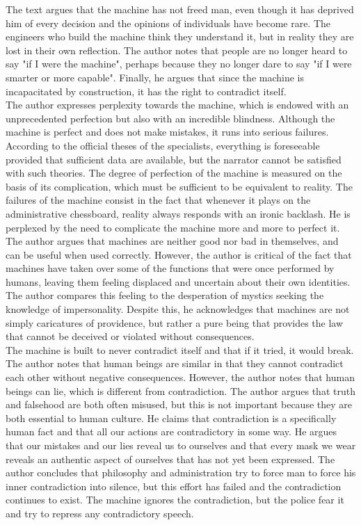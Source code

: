 \documentclass{homework}
\begin{document}
The text argues that the machine has not freed man, even though it has 
deprived him of every decision and the opinions of individuals have become rare. 
The engineers who build the machine think they understand it, but in reality 
they are lost in their own reflection. The author notes that people are no longer heard to 
say "if I were the machine", perhaps because they no longer dare to say "if I were smarter
or more capable".  
Finally, he argues that since the machine is incapacitated by construction, it has 
the right to contradict itself. \\
The author expresses perplexity towards the machine, which is 
endowed with an unprecedented perfection but also with an incredible blindness. 
Although the machine is perfect and does not make mistakes, it runs into serious 
failures. According to the official theses of the specialists, everything is 
foreseeable provided that sufficient data are available, but the narrator cannot 
be satisfied with such theories. The degree of perfection of the machine is 
measured on the basis of its complication, which must be sufficient to be 
equivalent to reality. The failures of the machine consist in the fact that 
whenever it plays on the administrative chessboard, reality always responds 
with an ironic backlash. He is perplexed by the need to complicate 
the machine more and more to perfect it. \\
The author argues that machines are neither good nor bad in themselves, 
and can be useful when used correctly. However, the author is critical of the fact 
that machines have taken over some of the functions that were once performed by 
humans, leaving them feeling displaced and uncertain about their own identities. 
The author compares this feeling to the desperation of mystics seeking the 
knowledge of impersonality. Despite this, he acknowledges that machines 
are not simply caricatures of providence, but rather a pure being that provides 
the law that cannot be deceived or violated without consequences. \\
The machine is built to never contradict itself and that if it tried, it 
would break. The author notes that human beings are similar in that they 
cannot contradict each other without negative consequences. However, 
the author notes that human beings can lie, which is different from 
contradiction. 
The author argues that truth and falsehood are both often misused, 
but this is not important because they are both essential to human 
culture. He claims that contradiction is a specifically 
human fact and that all our actions are contradictory in some way.
He argues that our mistakes and our lies reveal us to 
ourselves and that every mask we wear reveals an authentic aspect 
of ourselves that has not yet been expressed. The author concludes 
that philosophy and administration try to force man to force his 
inner contradiction into silence, but this effort has failed and 
the contradiction continues to exist. The machine ignores the 
contradiction, but the police fear it and try to repress any 
contradictory speech.
\end{document}
